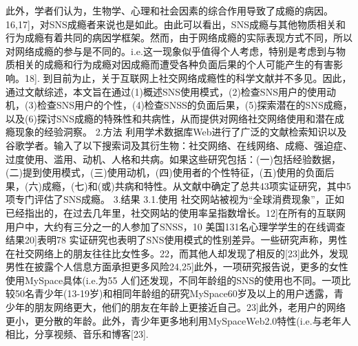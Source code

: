 此外，学者们认为，生物学、心理和社会因素的综合作用导致了成瘾的病因。16,17]，对SNS成瘾者来说也是如此。由此可以看出，SNS成瘾与其他物质相关和行为成瘾有着共同的病因学框架。然而，由于网络成瘾的实际表现方式不同，所以对网络成瘾的参与是不同的。i.e.这一现象似乎值得个人考虑，特别是考虑到与物质相关的成瘾和行为成瘾对因成瘾而遭受各种负面后果的个人可能产生的有害影响。18].
到目前为止，关于互联网上社交网络成瘾性的科学文献并不多见。因此，通过文献综述，本文旨在通过(1)概述SNS使用模式，(2)检查SNS用户的使用动机，(3)检查SNS用户的个性，(4)检查SNSS的负面后果，(5)探索潜在的SNS成瘾，以及(6)探讨SNS成瘾的特殊性和共病性，从而提供对网络社交网络使用和潜在成瘾现象的经验洞察。
2.方法
利用学术数据库Web进行了广泛的文献检索知识以及谷歌学者。输入了以下搜索词及其衍生物：社交网络、在线网络、成瘾、强迫症、过度使用、滥用、动机、人格和共病。如果这些研究包括：(一)包括经验数据，(二)提到使用模式，(三)使用动机，(四)使用者的个性特征，(五)使用的负面后果，(六)成瘾，(七)和(或)共病和特性。从文献中确定了总共43项实证研究，其中5项专门评估了SNS成瘾。
3.结果
3.1.使用
社交网站被视为“全球消费现象”，正如已经指出的，在过去几年里，社交网站的使用率呈指数增长。12]在所有的互联网用户中，大约有三分之一的人参加了SNSS，10%
美国131名心理学学生的在线调查结果20]表明78%
实证研究也表明了SNS使用模式的性别差异。一些研究声称，男性在社交网络上的朋友往往比女性多。22，而其他人却发现了相反的[23]此外，发现男性在披露个人信息方面承担更多风险24,25]此外，一项研究报告说，更多的女性使用MySpace具体(i.e.为55%
人们还发现，不同年龄组的SNS的使用也不同。一项比较50名青少年(13-19岁)和相同年龄组的研究MySpace60岁及以上的用户透露，青少年的朋友网络更大，他们的朋友在年龄上更接近自己。23]此外，老用户的网络更小，更分散的年龄。此外，青少年更多地利用MySpaceWeb2.0特性(i.e.与老年人相比，分享视频、音乐和博客[23].
